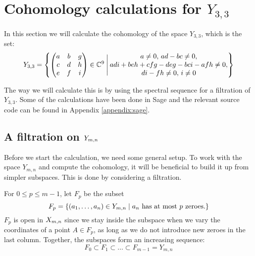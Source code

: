 


\chapter{Cohomology calculations for $Y_{3,3}$}
\label{chap:udregninger}

In this section we will calculate the cohomology of the space
$Y_{3,3}$, which is the set:
\[ Y_{3,3} = \left\{ 
  \begin{pmatrix}
    a & b & g \\
    c & d & h \\
    e & f & i
  \end{pmatrix} \in \mathbb{C}^9 \:\Bigg\vert\: 
  \begin{matrix}
    a\neq 0,\, ad-bc \neq 0, \\
    adi+beh+cfg-deg-bci-afh \neq 0, \\
    di-fh \neq 0,\, i \neq 0
  \end{matrix}  \right\} \]

The way we will calculate this is by using the spectral sequence for
a filtration of $Y_{3,3}$. Some of the calculations have
been done in Sage and the relevant source code can be found in
Appendix \ref{appendix:sage}.

\section{A filtration on $Y_{m,n}$}
\label{sec:filtration}

Before we start the calculation, we need some general setup. To work
with the space $Y_{m,n}$ and compute the cohomology, it will
be beneficial to build it up from simpler subspaces. This is done by
considering a filtration.

For $0 \leq p \leq m-1$, let $F_p$ be the subset
\[ F_p=\left\{  (a_1,\dots,a_n) \in Y_{m,n} \mid a_n \text{ has at most } p
  \text{ zeroes}. \right\} \]
$F_p$ is open in $X_{m,n}$ since we stay inside the subspace when we
vary the coordinates of a point $A\in F_p$, as long as we do not
introduce new zeroes in the last column.
Together, the subspaces form an increasing sequence:
\[ F_0 \subset F_1 \subset \dots \subset F_{m-1} = Y_{m,n} \]

